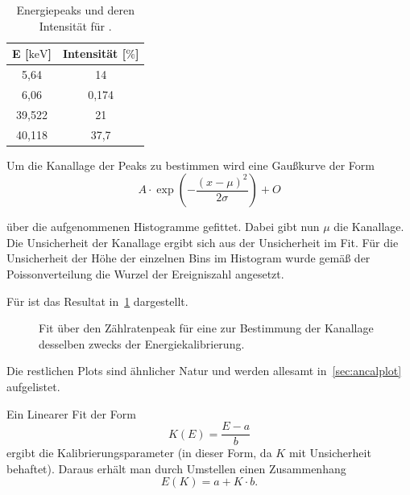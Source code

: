 \documentclass[slug=CS, room=Andreas-Schubert-Bau\,\ Labor\ 406,
supervisor=Juliane\ Volkmer, coursedate=29.\ 11.\ 2019]{../../Lab_Report_LaTeX/lab_report}
\begin{document}
\begin{table}[H]
  \centering
  \begin{tabular}{S|S}
    \toprule
    {E [\(\si{\kilo\electronvolt}\)]} & {Intensität [\(\si{\percent}\)]} \\
    \midrule
     5,64                              & 14                               \\
    6,06                              & 0,174                            \\
    39,522                            & 21                               \\
    40,118                            & 37,7
  \end{tabular}
  \caption{Energiepeaks und deren Intensität für .}
  \label{tab:eupeaks}
\end{table}

Um die Kanallage der Peaks zu bestimmen wird eine Gaußkurve der Form
\begin{equation}
  \label{eq:gaussfit}
  A\cdot\exp(-\frac{(x-\mu)^2}{2\sigma}) + O
\end{equation}

\"uber die aufgenommenen Histogramme gefittet. Dabei gibt nun \(\mu\)
die Kanallage. Die Unsicherheit der Kanallage ergibt sich aus der
Unsicherheit im Fit. Für die Unsicherheit der H\"ohe der einzelnen
Bins im Histogram wurde gem\"a\ss{} der Poissonverteilung die Wurzel
der Ereigniszahl angesetzt.

Für  ist das Resultat in~\ref{fig:calfitcs} dargestellt.
\begin{figure}[h]\centering
  
  \caption{Fit \"uber den Z\"ahlratenpeak f\"ur eine  zur
    Bestimmung der Kanallage desselben zwecks der Energiekalibrierung.}
  \label{fig:calfitcs}
\end{figure}

Die restlichen Plots sind \"ahnlicher Natur und werden allesamt
in~\ref{sec:ancalplot} aufgelistet.

Ein Linearer Fit der Form
\begin{equation}
  \label{eq:linclafit}
  K(E) = \frac{E-a}{b}
\end{equation}
ergibt die Kalibrierungsparameter (in dieser Form, da \(K\) mit
Unsicherheit behaftet). Daraus erhält man durch Umstellen
einen Zusammenhang
\begin{equation}
  \label{eq:eofk}
  E(K) = a + K\cdot b.
\end{equation}
\end{document}
